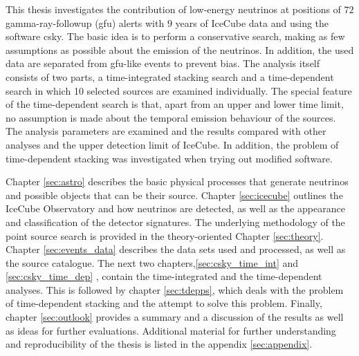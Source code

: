 This thesis investigates the contribution of low-energy neutrinos at positions of $\num{72}$ gamma-ray-followup (gfu) alerts with $\num{9}$ years of IceCube data and using the software csky.
The basic idea is to perform a conservative search, making as few assumptions as possible about the emission of the neutrinos.
In addition, the used data are separated from gfu-like events to prevent bias.
The analysis itself consists of two parts, a time-integrated stacking search and a time-dependent search in which 10 selected sources are examined individually.
The special feature of the time-dependent search is that, apart from an upper and lower time limit, no assumption is made about the temporal emission behaviour of the sources.
The analysis parameters are examined and the results compared with other analyses and the upper detection limit of IceCube.
In addition, the problem of time-dependent stacking was investigated when trying out modified software.

Chapter \ref{sec:astro} describes the basic physical processes that generate neutrinos and possible objects that can be their source.
Chapter \ref{sec:icecube} outlines the IceCube Observatory and how neutrinos are detected, as well as the appearance and classification of the detector signatures.
The underlying methodology of the point source search is provided in the theory-oriented Chapter \ref{sec:theory}.
Chapter \ref{sec:events_data} describes the data sets used and processed, as well as the source catalogue.
The next two chapters,\ref{sec:csky_time_int} and \ref{sec:csky_time_dep} , contain the time-integrated and the time-dependent analyses.
This is followed by chapter \ref{sec:tdepps}, which deals with the problem of time-dependent stacking and the attempt to solve this problem.
Finally, chapter \ref{sec:outlook} provides a summary and a discussion of the results as well as ideas for further evaluations.
Additional material for further understanding and reproducibility of the thesis is listed in the appendix \ref{sec:appendix}.
